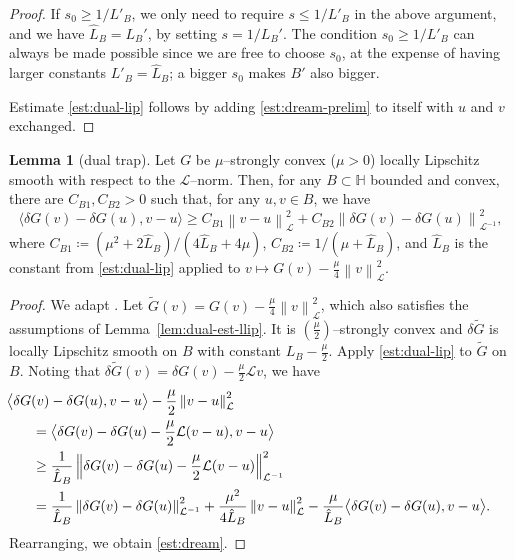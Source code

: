 \documentclass{amsart}
\newcommand{\dG}{{\delta G}}
\newcommand{\LL}{\mathcal{L}}
\newcommand{\LLinv}{{\mathcal{L}^{-1}}}
\newcommand{\norm}[2]{\left\| #1 \right\| _{#2}}
\newcommand{\pairing}[2]{\bigl\langle #1 , #2 \bigr\rangle}
\newcommand{\HH}{\mathbb{H}}
\newcommand{\CdvB}{{C_{B1}}} %
\newcommand{\CddB}{{C_{B2}}} %
\theoremstyle{definition}
\newtheorem{lem}[thm]{Lemma}
\begin{document}
\begin{proof}
	If $ s_0 \ge 1/L'_B$, we only need to require $s\le 1/L'_B$ in the above argument, and we have $\hat L_B =  L_B'$, by setting $s=1/ L_B'$. The condition $ s_0 \ge 1/L'_B$ can always be made possible since we are free to choose $s_0$, at the expense of having larger constants $L'_B=\hat L_B$; a bigger $s_0$ makes $B'$ also bigger. 
	
	Estimate \eqref{est:dual-lip} follows by adding \eqref{est:dream-prelim} to itself with $u$ and $v$ exchanged.
\end{proof}

\begin{lem}[dual trap]\label{lem:dream}
	Let $G$ be $\mu$--strongly convex ($\mu>0$) locally Lipschitz smooth with respect to the $\LL$--norm. Then, for any $B\subset\HH$ bounded and convex, there are $\CdvB,\CddB>0$ such that, for any $u,v\in B$, we have
	\begin{equation}\label{est:dream}
		\pairing{\delta G(v)-\delta G(u)}{v-u} \ge \CdvB\norm{v-u}{\LL}^2+\CddB\norm{\delta G(v)-\delta G(u)}{\LLinv}^2,
	\end{equation}
	where $\CdvB \coloneqq(\mu^2 + 2\hat L_B)/(4\hat L_B+4\mu)$, $\CddB \coloneqq 1/(\mu+\hat L_B)$, and $\hat L_B$ is the constant from \eqref{est:dual-lip} applied to $v \mapsto G(v)-\frac \mu 4 \norm{v}{\LL}^2$.
\end{lem}
\begin{proof}
  We adapt \cite[p.~77, Thm.~2.1.12 (2.1.32)]{nesterov2018lectures}. Let $\tilde{G}(v)=G(v)-\frac \mu 4 \norm{v}{\LL}^2$, which also satisfies the assumptions of Lemma~\ref{lem:dual-est-llip}. It is $(\frac \mu 2)$--strongly convex and $\delta\tilde{G}$ is locally Lipschitz smooth on $B$ with constant $L_B - \tfrac\mu2$. 
	Apply \eqref{est:dual-lip} to $\tilde{G}$ on $B$. Noting that $\delta \tilde{G}(v)=\dG(v)-\frac\mu 2\LL v$, we have
	\begin{align*}
& \hspace{-0.25in} \pairing{\delta G(v)-\delta G(u)}{v-u} -\frac \mu  2 \norm{v-u}{\LL}^2 
	\\
& =\pairing{\delta G(v)-\delta G(u) -\frac \mu 2\LL(v-u)}{v-u} 
		\\		
& \ge \frac{1}{\hat L_B}\norm{\delta G(v)-\delta G(u) -\frac \mu  2\LL(v-u)}{\LLinv}^2
	\\
& = \frac{1}{\hat L_B}\norm{\delta G(v)-\delta G(u)}{\LLinv}^2 + \frac{\mu^2}{4\hat L_B}\norm{v-u}{\LL}^2 -\frac{\mu}{\hat L_B}\pairing{\delta G(v)-\delta G(u)}{v-u}.
	\end{align*} 
	Rearranging, we obtain \eqref{est:dream}.
\end{proof}
\end{document}
